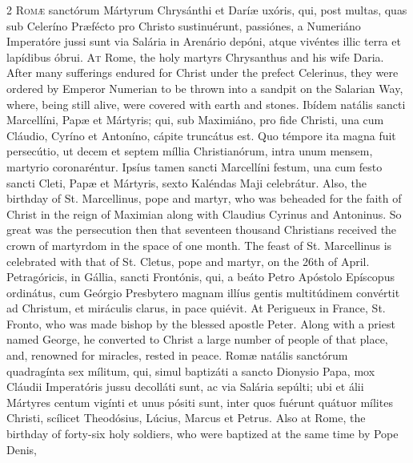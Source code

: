\begin{paracol}{2}
\lettrine[lines=2]{R}{omæ} sanctórum Mártyrum 
 Chrysánthi et Daríæ uxóris, qui, post multas, quas sub Celeríno Præfécto pro 
 Christo sustinuérunt, passiónes, a Numeriáno Imperatóre jussi sunt via 
 Salária in Arenário depóni, atque vivéntes illic terra et lapídibus óbrui.
\switchcolumn
{}
\lettrine[lines=2]{A}{t} Rome, the holy martyrs 
 Chrysanthus and his wife Daria. After many sufferings endured for 
 Christ under the prefect Celerinus, they were ordered by Emperor Numerian to 
 be thrown into a sandpit on the Salarian Way, where, being still alive, were 
 covered with earth and stones.
\switchcolumn*
{}
Ibídem natális sancti 
 Marcellíni, Papæ et Mártyris; qui, sub Maximiáno, pro fide Christi, una cum 
 Cláudio, Cyríno et Antoníno, cápite truncátus est. Quo témpore ita 
 magna fuit persecútio, ut decem et septem míllia Christianórum, intra unum 
 mensem, martyrio coronaréntur. Ipsíus tamen sancti Marcellíni festum, 
 una cum festo sancti Cleti, Papæ et Mártyris, sexto Kaléndas Maji celebrátur.
\switchcolumn
{}
Also, the birthday of St. 
 Marcellinus, pope and martyr, who was beheaded for the faith of Christ in 
 the reign of Maximian along with Claudius Cyrinus and Antoninus. So 
 great was the persecution then that seventeen thousand Christians received 
 the crown of martyrdom in the space of one month. The feast of St. 
 Marcellinus is celebrated with that of St. Cletus, pope and martyr, on the 
 26th of April.
\switchcolumn*
{}
Petragóricis, in 
 Gállia, sancti Frontónis, qui, a beáto Petro Apóstolo Epíscopus ordinátus, 
 cum Geórgio Presbytero magnam illíus gentis multitúdinem convértit ad 
 Christum, et miráculis clarus, in pace quiévit.
\switchcolumn
{}
At Perigueux in France, St. Fronto, 
 who was made bishop by the blessed apostle Peter. Along with a priest 
 named George, he converted to Christ a large number of people of that place, 
 and, renowned for miracles, rested in peace.
\switchcolumn*
{}
Romæ natális sanctórum 
 quadragínta sex mílitum, qui, simul baptizáti a sancto Dionysio Papa, mox 
 Cláudii Imperatóris jussu decolláti sunt, ac via Salária sepúlti; ubi et 
 álii Mártyres centum vigínti et unus pósiti sunt, inter quos fuérunt quátuor 
 mílites Christi, scílicet Theodósius, Lúcius, Marcus et Petrus.
\switchcolumn
{}
Also at Rome, the birthday of 
 forty-six holy soldiers, who were baptized at the same time by Pope Denis, 

\end{paracol}
